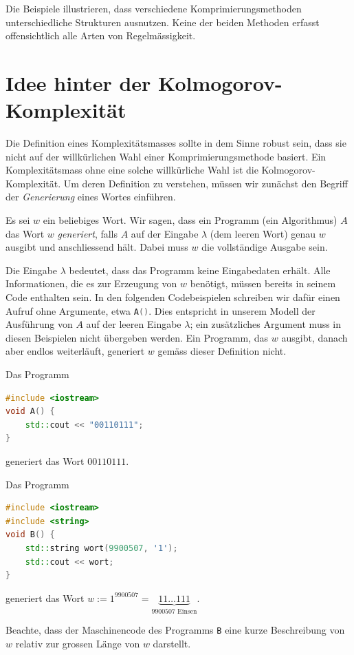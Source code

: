 Die Beispiele illustrieren, dass verschiedene Komprimierungsmethoden unterschiedliche Strukturen ausnutzen. Keine der beiden Methoden erfasst offensichtlich alle Arten von Regelmässigkeit.

\section{Idee hinter der Kolmogorov-Komplexität}
Die Definition eines Komplexitätsmasses sollte in dem Sinne robust sein, dass sie nicht auf der willkürlichen Wahl einer Komprimierungsmethode basiert. Ein Komplexitätsmass ohne eine solche willkürliche Wahl ist die Kolmogorov-Komplexität. Um deren Definition zu verstehen, müssen wir zunächst den Begriff der \textit{Generierung} eines Wortes einführen.

\begin{mydefinition}\label{mydefinition:erzeugung}
Es sei $w$ ein beliebiges Wort. Wir sagen, dass ein Programm (ein Algorithmus) $A$ das Wort $w$ \emph{generiert}, falls $A$ auf der Eingabe $\lambda$ (dem leeren Wort) genau $w$ ausgibt und anschliessend hält. Dabei muss $w$ die vollständige Ausgabe sein.
\end{mydefinition}

Die Eingabe $\lambda$ bedeutet, dass das Programm keine Eingabedaten erhält. Alle Informationen, die es zur Erzeugung von $w$ benötigt, müssen bereits in seinem Code enthalten sein. In den folgenden Codebeispielen schreiben wir dafür einen Aufruf ohne Argumente, etwa \lstinline[language=C++]{A()}. Dies entspricht in unserem Modell der Ausführung von $A$ auf der leeren Eingabe $\lambda$; ein zusätzliches Argument muss in diesen Beispielen nicht übergeben werden. Ein Programm, das $w$ ausgibt, danach aber endlos weiterläuft, generiert $w$ gemäss dieser Definition nicht.

\begin{myexample}\label{myexample:generateA}
Das Programm
\begin{lstlisting}[language=C++]
#include <iostream>
void A() {
    std::cout << "00110111";
}
\end{lstlisting}
generiert das Wort $00110111$.
\end{myexample}

\begin{myexample}
Das Programm
\begin{lstlisting}[language=C++]
#include <iostream>
#include <string>
void B() {
    std::string wort(9900507, '1');
    std::cout << wort;
}
\end{lstlisting}
generiert das Wort $w := 1^{9900507} = \underbrace{11\ldots 111}_{\text{9900507 Einsen}}$.
\par
Beachte, dass der Maschinencode des Programms \texttt{B} eine kurze Beschreibung von $w$ relativ zur grossen Länge von $w$ darstellt.
\end{myexample}

